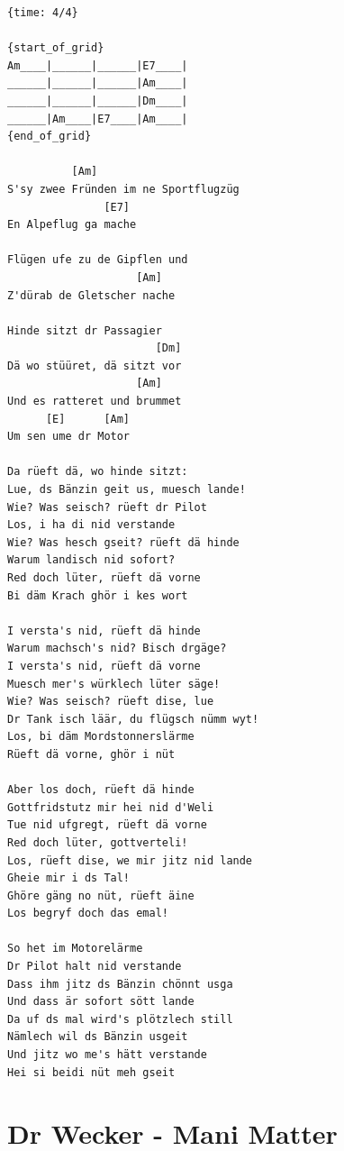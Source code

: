 \documentclass[
]{book}
\let\stdsection\section
\renewcommand\section{\clearpage\stdsection}
\begin{document}
\begin{verbatim}
{time: 4/4}

{start_of_grid}
Am____|______|______|E7____|
______|______|______|Am____|
______|______|______|Dm____|
______|Am____|E7____|Am____|
{end_of_grid}

          [Am]
S'sy zwee Fründen im ne Sportflugzüg
               [E7]
En Alpeflug ga mache

Flügen ufe zu de Gipflen und
                    [Am]
Z'dürab de Gletscher nache

Hinde sitzt dr Passagier
                       [Dm]
Dä wo stüüret, dä sitzt vor
                    [Am]
Und es ratteret und brummet
      [E]      [Am]
Um sen ume dr Motor

Da rüeft dä, wo hinde sitzt:
Lue, ds Bänzin geit us, muesch lande!
Wie? Was seisch? rüeft dr Pilot
Los, i ha di nid verstande
Wie? Was hesch gseit? rüeft dä hinde
Warum landisch nid sofort?
Red doch lüter, rüeft dä vorne
Bi däm Krach ghör i kes wort

I versta's nid, rüeft dä hinde
Warum machsch's nid? Bisch drgäge?
I versta's nid, rüeft dä vorne
Muesch mer's würklech lüter säge!
Wie? Was seisch? rüeft dise, lue
Dr Tank isch läär, du flügsch nümm wyt!
Los, bi däm Mordstonnerslärme
Rüeft dä vorne, ghör i nüt

Aber los doch, rüeft dä hinde
Gottfridstutz mir hei nid d'Weli
Tue nid ufgregt, rüeft dä vorne
Red doch lüter, gottverteli!
Los, rüeft dise, we mir jitz nid lande
Gheie mir i ds Tal!
Ghöre gäng no nüt, rüeft äine
Los begryf doch das emal!

So het im Motorelärme
Dr Pilot halt nid verstande
Dass ihm jitz ds Bänzin chönnt usga
Und dass är sofort sött lande
Da uf ds mal wird's plötzlech still
Nämlech wil ds Bänzin usgeit
Und jitz wo me's hätt verstande
Hei si beidi nüt meh gseit 

\end{verbatim}

\hypertarget{dr-wecker---mani-matter}{%
\section{Dr Wecker - Mani Matter}\label{dr-wecker---mani-matter}}
\end{document}
